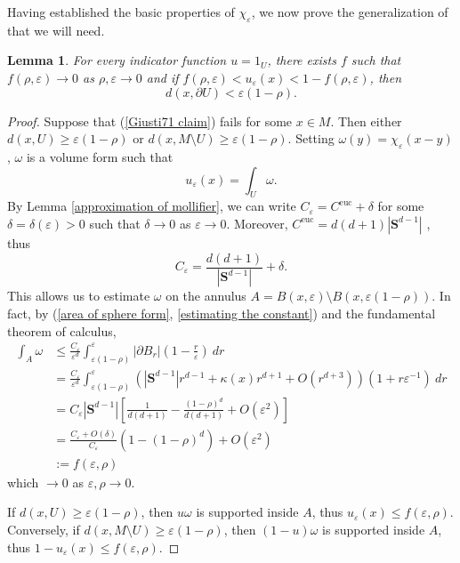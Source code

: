 \documentclass[reqno,12pt,letterpaper]{amsart}
\newcommand{\Sph}{\mathbf S}
\newtheorem{lemma}[theorem]{Lemma}
\theoremstyle{definition}
\numberwithin{equation}{section}
\begin{document}
Having established the basic properties of $\chi_\varepsilon$, we now prove the generalization of \cite[Lemma 7.1]{Giusti77} that we will need.

\begin{lemma}\label{Giusti71}
For every indicator function $u = 1_U$, there exists $f$ such that $f(\rho, \varepsilon) \to 0$ as $\rho,\varepsilon \to 0$ and if $f(\rho, \varepsilon) < u_\varepsilon(x) < 1 - f(\rho, \varepsilon)$,
then
\begin{equation}\label{Giusti71 claim}
d(x, \partial U) < \varepsilon(1 - \rho).
\end{equation}
\end{lemma}
\begin{proof}
Suppose that (\ref{Giusti71 claim}) fails for some $x \in M$. Then either $d(x, U) \geq \varepsilon(1 - \rho)$ or $d(x, M \setminus U) \geq \varepsilon(1 - \rho)$.
Setting $\omega(y) = \chi_\varepsilon(x - y)$, $\omega$ is a volume form such that
$$u_\varepsilon(x) = \int_U \omega.$$
By Lemma \ref{approximation of mollifier}, we can write $C_\varepsilon = C^{\mathrm{euc}} + \delta$ for some $\delta = \delta(\varepsilon) > 0$ such that $\delta \to 0$ as $\varepsilon \to 0$.
Moreover, $C^{\mathrm{euc}} = d(d + 1)|\Sph^{d - 1}|$ \cite[Lemma 7.1]{Giusti77}, thus
\begin{equation}\label{estimating the constant}
C_\varepsilon = \frac{d(d + 1)}{|\Sph^{d - 1}|} + \delta.
\end{equation}
This allows us to estimate $\omega$ on the annulus $A = B(x, \varepsilon) \setminus B(x, \varepsilon(1 - \rho))$.
In fact, by (\ref{area of sphere form}, \ref{estimating the constant}) and the fundamental theorem of calculus,
\begin{align*}
\int_A \omega &\leq \frac{C_\varepsilon}{\varepsilon^d}\int_{\varepsilon(1 - \rho)}^\varepsilon |\partial B_r| \left(1 - \frac{r}{\varepsilon}\right) ~dr\\
&= \frac{C_\varepsilon}{\varepsilon^d} \int_{\varepsilon(1 - \rho)}^\varepsilon (|\Sph^{d - 1}|r^{d - 1} + \kappa(x) r^{d + 1} + O(r^{d + 3}))(1 + r\varepsilon^{-1}) ~dr \\
&= C_\varepsilon|\Sph^{d - 1}|\left[\frac{1}{d(d + 1)} - \frac{(1 - \rho)^d}{d(d + 1)} + O(\varepsilon^2)\right] \\
&= \frac{C_\varepsilon + O(\delta)}{C_\varepsilon}(1 - (1 - \rho)^d) + O(\varepsilon^2) \\
&:= f(\varepsilon, \rho)
\end{align*}
which $\to 0$ as $\varepsilon, \rho \to 0$.

If $d(x, U) \geq \varepsilon(1 - \rho)$, then $u\omega$ is supported inside $A$, thus $u_\varepsilon(x) \leq f(\varepsilon, \rho)$.
Conversely, if $d(x, M \setminus U) \geq \varepsilon(1 - \rho)$, then $(1 - u)\omega$ is supported inside $A$, thus $1 - u_\varepsilon(x) \leq f(\varepsilon, \rho)$.
\end{proof}
\end{document}
